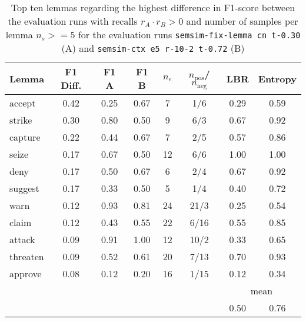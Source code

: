 \documentclass[11pt]{scrreprt}
\begin{document}
{\begin{table}[p]
\centering
\begin{tabular}{lccccccc}
\toprule
Lemma      & F1 Diff. & F1 A & F1 B & \(n_e\) & \(n_\text{pos}\)/\(n_\text{neg}\) & LBR & Entropy \\
\midrule
accept     & 0.42      & 0.25           & 0.67           & 7               & 1/6     & 0.29 & 0.59 \\
strike     & 0.30      & 0.80           & 0.50           & 9               & 6/3     & 0.67 & 0.92 \\
capture    & 0.22      & 0.44           & 0.67           & 7               & 2/5     & 0.57 & 0.86 \\
seize      & 0.17      & 0.67           & 0.50           & 12              & 6/6     & 1.00 & 1.00 \\
deny       & 0.17      & 0.50           & 0.67           & 6               & 2/4     & 0.67 & 0.92 \\
suggest    & 0.17      & 0.33           & 0.50           & 5               & 1/4     & 0.40 & 0.72 \\
warn       & 0.12      & 0.93           & 0.81           & 24              & 21/3    & 0.25 & 0.54 \\
claim      & 0.12      & 0.43           & 0.55           & 22              & 6/16    & 0.55 & 0.85 \\
attack     & 0.09      & 0.91           & 1.00           & 12              & 10/2    & 0.33 & 0.65 \\
threaten   & 0.09      & 0.52           & 0.61           & 20              & 7/13    & 0.70 & 0.93 \\
approve    & 0.08      & 0.12           & 0.20           & 16              & 1/15    & 0.12 & 0.34 \\
\cmidrule{7-8}
\multicolumn{6}{l}{} & \multicolumn{2}{c}{mean} \\
\multicolumn{6}{l}{} & 0.50 & 0.76 \\
\bottomrule
\end{tabular}
\caption{Top ten lemmas regarding the highest difference in F1-score between the evaluation runs with recalls \(r_A \cdot r_B > 0\) and number of samples per lemma \(n_s >= 5\) for the evaluation runs \texttt{semsim-fix-lemma cn t-0.30} (A) and \texttt{semsim-ctx e5 r-10-2 t-0.72} (B)}
\label{tab:predicate-lemma-highest-f1-both-recall-non-zero}
\end{table}


}
\end{document}

